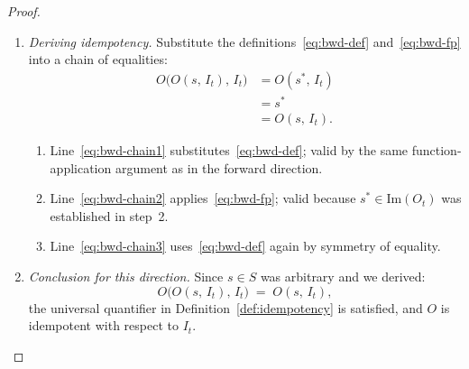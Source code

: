 \documentclass[12pt,openany]{book}
\newcommand{\calI}{\mathcal{I}}
\numberwithin{equation}{chapter}
\theoremstyle{plain}
\theoremstyle{definition}
\theoremstyle{remark}
\numberwithin{equation}{chapter}
\theoremstyle{plain}
\newcommand{\calS}{\mathcal{S}}
\def\calI{I}%
\def\calS{S}%
\begin{document}
\begin{proof}
\begin{enumerate}
  \item \emph{Deriving idempotency.}
        Substitute the definitions~\eqref{eq:bwd-def}
        and~\eqref{eq:bwd-fp} into a chain of equalities:
        \begin{align}
          O\!\bigl(O(s,\,\calI_t),\,\calI_t\bigr)
            &= O(s^*,\,\calI_t)
               \label{eq:bwd-chain1}\\
            &= s^*
               \label{eq:bwd-chain2}\\
            &= O(s,\,\calI_t).
               \label{eq:bwd-chain3}
        \end{align}
        \begin{enumerate}
          \item Line~\eqref{eq:bwd-chain1} substitutes~\eqref{eq:bwd-def};
                valid by the same function-application argument as in
                the forward direction.
          \item Line~\eqref{eq:bwd-chain2} applies~\eqref{eq:bwd-fp};
                valid because $s^* \in \mathrm{Im}(O_t)$ was established
                in step~2.
          \item Line~\eqref{eq:bwd-chain3}
                uses~\eqref{eq:bwd-def} again by symmetry of equality.
        \end{enumerate}

  \item \emph{Conclusion for this direction.}
        Since $s \in \calS$ was arbitrary and we derived:
        \begin{equation}
          O\!\bigl(O(s,\,\calI_t),\,\calI_t\bigr)
          \;=\; O(s,\,\calI_t),
          \label{eq:fixpoint-bwd}
        \end{equation}
        the universal quantifier in Definition~\ref{def:idempotency} is
        satisfied, and $O$ is idempotent with respect to $\calI_t$.
\end{enumerate}


\end{proof}
\end{document}
